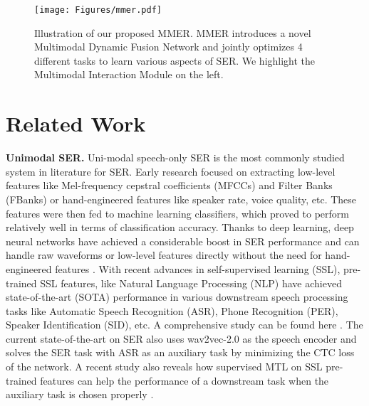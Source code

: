 \documentclass{INTERSPEECH2023}
\begin{document}
\begin{figure*}[t]
\centering
\texttt{[image: Figures/mmer.pdf]}
\caption{\small Illustration of our proposed MMER. MMER introduces a novel Multimodal Dynamic Fusion Network and jointly optimizes 4 different tasks to learn various aspects of SER. We highlight the Multimodal Interaction Module on the left.} 
\label{fig:mmer}
\end{figure*}

\section{Related Work}
{\noindent \textbf{Unimodal SER.}} Uni-modal speech-only SER is the most commonly studied system in literature for SER. Early research focused on extracting low-level features like Mel-frequency cepstral coefficients (MFCCs) and Filter Banks (FBanks) or hand-engineered features like speaker rate, voice quality, etc. These features were then fed to machine learning classifiers, which proved to perform relatively well in terms of classification accuracy. Thanks to deep learning, deep neural networks have achieved a considerable boost in SER performance and can handle raw waveforms or low-level features directly without the need for hand-engineered features \cite{sarma2018emotion,keesing2021acoustic}. With recent advances in self-supervised learning (SSL), pre-trained SSL features, like Natural Language Processing (NLP) \cite{devlin2018bert} have achieved state-of-the-art (SOTA) performance in various downstream speech processing tasks like Automatic Speech Recognition (ASR), Phone Recognition (PER), Speaker Identification (SID), etc. A comprehensive study can be found here \cite{yang21c_interspeech}. The current state-of-the-art on SER \cite{cai21b_interspeech} also uses wav2vec-2.0 as the speech encoder and solves the SER task with ASR as an auxiliary task by minimizing the CTC loss of the network. A recent study also reveals how supervised MTL on SSL pre-trained features can help the performance of a downstream task when the auxiliary task is chosen properly \cite{parthasarathy2018ladder}. 

\vspace{1mm}
\end{document}

